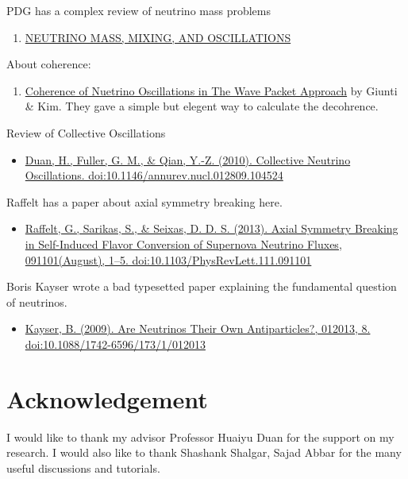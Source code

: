 \documentclass[letterpaper,12pt,english]{sphinxmanual}
\begin{document}
PDG has a complex review of neutrino mass problems
\begin{enumerate}
\item {} 
\href{http://pdg.lbl.gov/2012/reviews/rpp2012-rev-neutrino-mixing.pdf}{NEUTRINO MASS, MIXING, AND OSCILLATIONS}

\end{enumerate}

About coherence:
\begin{enumerate}
\item {} 
\href{http://journals.aps.org/prd/abstract/10.1103/PhysRevD.58.017301}{Coherence of Nuetrino Oscillations in The Wave Packet Approach} by Giunti \& Kim. They gave a simple but elegent way to calculate the decohrence.

\end{enumerate}

Review of Collective Oscillations
\begin{itemize}
\item {} 
\href{http://arxiv.org/abs/1001.2799}{Duan, H., Fuller, G. M., \& Qian, Y.-Z. (2010). Collective Neutrino Oscillations. doi:10.1146/annurev.nucl.012809.104524}

\end{itemize}

Raffelt has a paper about axial symmetry breaking here.
\begin{itemize}
\item {} 
\href{http://arxiv.org/abs/1305.7140}{Raffelt, G., Sarikas, S., \& Seixas, D. D. S. (2013). Axial Symmetry Breaking in Self-Induced Flavor Conversion of Supernova Neutrino Fluxes, 091101(August), 1–5. doi:10.1103/PhysRevLett.111.091101}

\end{itemize}

Boris Kayser wrote a bad typesetted paper explaining the fundamental question of neutrinos.
\begin{itemize}
\item {} 
\href{http://arxiv.org/abs/0903.0899}{Kayser, B. (2009). Are Neutrinos Their Own Antiparticles?, 012013, 8. doi:10.1088/1742-6596/173/1/012013}

\end{itemize}


\chapter{Acknowledgement}
\label{acknowledgement::doc}\label{acknowledgement:acknowledgement}
I would like to thank my advisor Professor Huaiyu Duan for the support on my research. I would also like to thank Shashank Shalgar, Sajad Abbar for the many useful discussions and tutorials.
\end{document}
